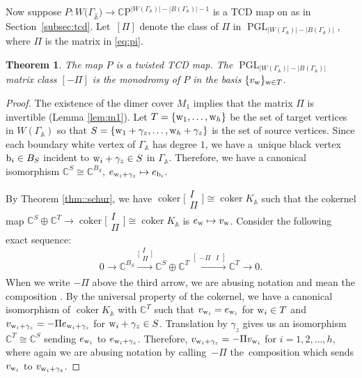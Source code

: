 \documentclass[pdftex]{sigma}
\numberwithin{equation}{section}
\newtheorem{Theorem}{Theorem}[section]
\newcommand{\C}{{\mathbb C}}
\newcommand{\CP}{{\mathbb C\mathrm P}}
\newcommand{\A}{{\mathbb A}}
\newcommand{\PGL}{\operatorname{PGL}}
\newcommand{\ra}{\rightarrow}
\newcommand{\la}{\label}
\newcommand{\w}{{\rm w}}
\newcommand{\bw}{{\rm b}}
\DeclareMathOperator{\coker}{coker}
\begin{document}
	Now suppose $P\colon W\bigl(\Gamma_{\widehat \A}\bigr) \ra \CP^{|W(\Gamma_{\A})|-|B(\Gamma_{\A})|-1}$ is a TCD map on \smash{$\Gamma_{\widehat \A}$} as in Section~\ref{subsec:tcd}. Let~$[\Pi]$ denote the class of $\Pi$ in $\PGL_{|W(\Gamma_{\A})|-|B(\Gamma_{\A})|}$, where $\Pi$ is the matrix in \eqref{eq:pi}.
	\begin{Theorem} \la{prop:mon}
		The map $P$ is a twisted TCD map. The $\PGL_{|W(\Gamma_{\A})|-|B(\Gamma_{\A})|}$ matrix {class} $[-\Pi]$ is the monodromy of $P$ in the basis $\{v_\w\}_{\w \in T}$.
	\end{Theorem}
	\begin{proof}
		The existence of the dimer cover $M_1$ implies that the matrix $\Pi$ is invertible (Lemma \ref{lem:m1}). Let $T=\{{\rm w}_1,\dots,{\rm w}_h\}$ be the set of target vertices in $W(\Gamma_{\A})$ so that $S=\{{\rm w}_1+\gamma_z,\dots,{\rm w}_h+\gamma_z\}$ is the set of source vertices. Since each boundary white vertex of $\Gamma_\A$ has degree $1$, we have a~unique black vertex $\bw_i \in B_S$ incident to $\w_i+\gamma_z \in S$ in $\Gamma_\A$. Therefore, we have a canonical isomorphism $\C^{S} \cong \C^{B_S}$, $e_{\w_i+\gamma_z} \mapsto e_{{\mathrm b}_i}$.
		
		By Theorem \ref{thm::schur}, we have $\coker \bigl[\begin{smallmatrix}
			I\\
			\Pi
		\end{smallmatrix}\bigr] \cong \coker K_\A$ such that the cokernel map $\C^S \oplus \C^T \ra \coker \bigl[\begin{smallmatrix}
			I\\
			\Pi
		\end{smallmatrix}\bigr] \cong \coker K_\A$ is $e_\w \mapsto v_\w$. Consider the following exact sequence:
		\[
		0 \ra \C^{B_S} \xrightarrow[]{\bigl[\begin{smallmatrix}
				I\\
				\Pi
		\end{smallmatrix}\bigr]} \C^S \oplus \C^T \xrightarrow[]{[\begin{smallmatrix}
				-\Pi & I
		\end{smallmatrix}]} \C^T \ra 0.
		\]
		When we write $-\Pi$ above the third arrow, we are abusing notation and mean the composition \smash{$\C^S \cong \C^{B_S} \xrightarrow[]{-\Pi} \C^T$}. By the universal property of the cokernel, we have a canonical isomorphism of $\coker K_\A$ with $\C^T$ such that $v_{\w_i} = e_{\w_i} $ for $\w_i \in T$ and $v_{\w_i+\gamma_z} = -\Pi e_{\w_i+\gamma_z}$ for ${\w_i+\gamma_z \in S}$. Translation by $\gamma_z$ gives us an isomorphism $\C^T \cong \C^S$ sending $e_{\w_i}$ to $e_{\w_i + \gamma_z}$. Therefore, ${v_{{\rm w}_i+\gamma_z}=-\Pi{}v_{{\rm w}_i}}$ for $i=1,2,\dots,h$, where again we are abusing notation by calling~$-\Pi$ the~composition \smash{$\C^T \cong \C^S \xrightarrow[]{-\Pi} \C^T$} which sends $v_{\w _i}$ to $v_{\w_i + \gamma_z}$.
		

\end{proof}
\end{document}
